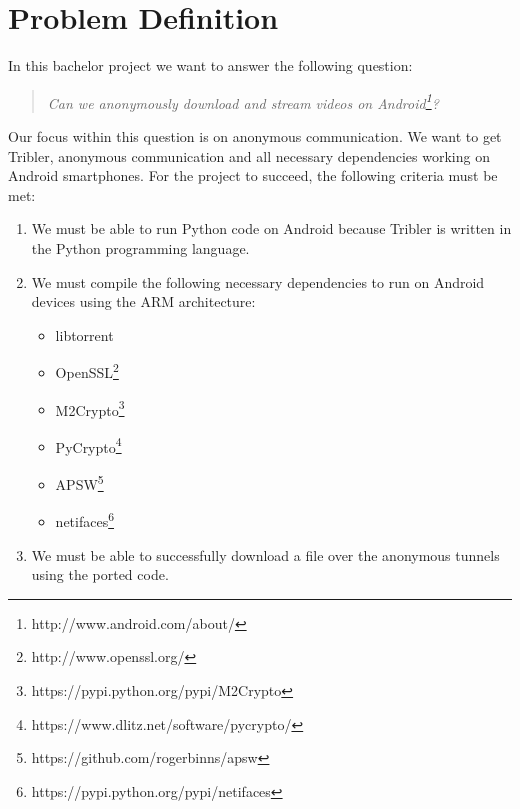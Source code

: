 \chapter{Problem Definition}
\label{cpt:problemdefinition}

In this bachelor project we want to answer the following question:

\begin{quote}
\emph{Can we anonymously download and stream videos on Android\footnote{http://www.android.com/about/}?}
\end{quote}

Our focus within this question is on anonymous communication. We want to get Tribler, anonymous communication and all necessary dependencies working on Android smartphones. For the project to succeed, the following criteria must be met:
\begin{enumerate}
\item We must be able to run Python code on Android because Tribler is written in the Python programming language.
\item We must compile the following necessary dependencies to run on Android devices using the ARM architecture:
\begin{itemize}
\item libtorrent
\item OpenSSL\footnote{http://www.openssl.org/}
\item M2Crypto\footnote{https://pypi.python.org/pypi/M2Crypto}
\item PyCrypto\footnote{https://www.dlitz.net/software/pycrypto/}
\item APSW\footnote{https://github.com/rogerbinns/apsw}
\item netifaces\footnote{https://pypi.python.org/pypi/netifaces}
\end{itemize}
\item We must be able to successfully download a file over the anonymous tunnels using the ported code.
\end{enumerate}

